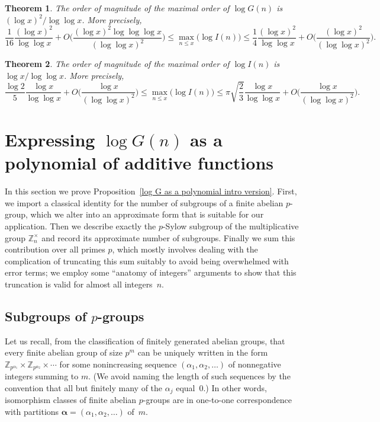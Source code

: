 \documentclass[12pt,reqno]{amsart}
\newtheorem{theorem}{Theorem}[section]
\theoremstyle{definition}
\newcommand{\Z}{{\mathbb Z}}
\newcommand{\Znt}{{\Z_n^\times}}
\newcommand{\balpha}{{\bm\alpha}}
\begin{document}
\begin{theorem}\label{max order Gn}
The order of magnitude of the maximal order of $\log G(n)$ is ${(\log x)^2}/{\log\log x}$. More precisely,
\[
\frac1{16} \frac{(\log x)^2}{\log\log x} + O\bigg( \frac{(\log x)^2\log\log\log x}{(\log\log x)^2} \bigg) \leq \max_{n \leq x} \big( \log I(n) \big) \leq \frac1{4} \frac{(\log x)^2}{\log\log x} + O\bigg( \frac{(\log x)^2}{(\log\log x)^2} \bigg).
\]
\end{theorem}

\begin{theorem}\label{max order In}
The order of magnitude of the maximal order of $\log I(n)$ is ${\log x}/{\log\log x}$. More precisely,
\[
\frac{\log 2}{5} \frac{\log x}{\log\log x} + O\bigg( \frac{\log x}{(\log\log x)^2} \bigg) \leq \max_{n \leq x} \big( \log I(n) \big) \leq \pi\sqrt{\frac23} \frac{\log x}{\log\log x} + O\bigg( \frac{\log x}{(\log\log x)^2} \bigg).
\]
\end{theorem}


\section{Expressing $\log G(n)$ as a polynomial of additive functions}  \label{from partitions section}

In this section we prove Proposition~\ref{log G as a polynomial intro version}. First, we import a classical identity for the number of subgroups of a finite abelian $p$-group, which we alter into an approximate form that is suitable for our application. Then we describe exactly the $p$-Sylow subgroup of the multiplicative group $\Znt$ and record its approximate number of subgroups. Finally we sum this contribution over all primes $p$, which mostly involves dealing with the complication of truncating this sum suitably to avoid being overwhelmed with error terms; we employ some ``anatomy of integers'' arguments to show that this truncation is valid for almost all integers~$n$.


\subsection{Subgroups of $p$-groups}  \label{subgroups of p groups section}

Let us recall, from the classification of finitely generated abelian groups, that every finite abelian group of size $p^m$ can be uniquely written in the form $\Z_{p^{\alpha_1}} \times \Z_{p^{\alpha_2}} \times \cdots$ for some nonincreasing sequence $(\alpha_1,\alpha_2,\dots)$ of nonnegative integers summing to $m$. (We avoid naming the length of such sequences by the convention that all but finitely many of the $\alpha_j$ equal~$0$.) In other words, isomorphism classes of finite abelian $p$-groups are in one-to-one correspondence with partitions $\balpha = (\alpha_1,\alpha_2,\dots)$ of~$m$.
\end{document}
